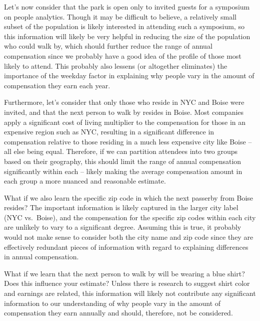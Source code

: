 \documentclass[]{book}
\begin{document}
Let's now consider that the park is open only to invited guests for a symposium on people analytics. Though it may be difficult to believe, a relatively small subset of the population is likely interested in attending such a symposium, so this information will likely be very helpful in reducing the size of the population who could walk by, which should further reduce the range of annual compensation since we probably have a good idea of the profile of those most likely to attend. This probably also lessens (or altogether eliminates) the importance of the weekday factor in explaining why people vary in the amount of compensation they earn each year.

Furthermore, let's consider that only those who reside in NYC and Boise were invited, and that the next person to walk by resides in Boise. Most companies apply a significant cost of living multiplier to the compensation for those in an expensive region such as NYC, resulting in a significant difference in compensation relative to those residing in a much less expensive city like Boise -- all else being equal. Therefore, if we can partition attendees into two groups based on their geography, this should limit the range of annual compensation significantly within each -- likely making the average compensation amount in each group a more nuanced and reasonable estimate.

What if we also learn the specific zip code in which the next passerby from Boise resides? The important information is likely captured in the larger city label (NYC vs.~Boise), and the compensation for the specific zip codes within each city are unlikely to vary to a significant degree. Assuming this is true, it probably would not make sense to consider both the city name and zip code since they are effectively redundant pieces of information with regard to explaining differences in annual compensation.

What if we learn that the next person to walk by will be wearing a blue shirt? Does this influence your estimate? Unless there is research to suggest shirt color and earnings are related, this information will likely not contribute any significant information to our understanding of why people vary in the amount of compensation they earn annually and should, therefore, not be considered.
\end{document}
